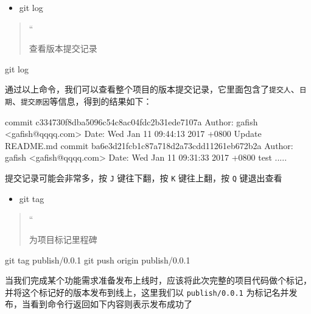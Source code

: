 \documentclass[
]{article}
\newenvironment{Shaded}{}{}
\newcommand{\NormalTok}[1]{#1}
\begin{document}
\begin{itemize}
\item
  git log
\end{itemize}

\begin{quote}
``

查看版本提交记录
\end{quote}

\begin{Shaded}
\begin{Highlighting}[]
\NormalTok{git log}
\end{Highlighting}
\end{Shaded}

通过以上命令，我们可以查看整个项目的版本提交记录，它里面包含了\texttt{提交人}、\texttt{日期}、\texttt{提交原因}等信息，得到的结果如下：

\begin{Shaded}
\begin{Highlighting}[]
\NormalTok{commit c334730f8dba5096c54c8ac04fdc2b31ede7107a}
\NormalTok{Author: gafish \textless{}gafish@qqqq.com\textgreater{}}
\NormalTok{Date:   Wed Jan 11 09:44:13 2017 +0800}
\NormalTok{    Update README.md}
\NormalTok{commit ba6e3d21fcb1c87a718d2a73cdd11261eb672b2a}
\NormalTok{Author: gafish \textless{}gafish@qqqq.com\textgreater{}}
\NormalTok{Date:   Wed Jan 11 09:31:33 2017 +0800}
\NormalTok{    test}
\NormalTok{.....}
\end{Highlighting}
\end{Shaded}

提交记录可能会非常多，按 \texttt{J} 键往下翻，按 \texttt{K} 键往上翻，按
\texttt{Q} 键退出查看

\begin{itemize}
\item
  git tag
\end{itemize}

\begin{quote}
``

为项目标记里程碑
\end{quote}

\begin{Shaded}
\begin{Highlighting}[]
\NormalTok{git tag publish/0.0.1}
\NormalTok{git push origin publish/0.0.1}
\end{Highlighting}
\end{Shaded}

当我们完成某个功能需求准备发布上线时，应该将此次完整的项目代码做个标记，并将这个标记好的版本发布到线上，这里我们以
\texttt{publish/0.0.1}
为标记名并发布，当看到命令行返回如下内容则表示发布成功了
\end{document}
